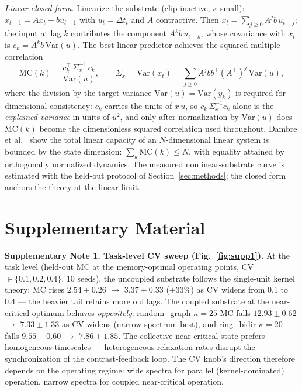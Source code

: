 \documentclass[11pt]{article}
\newcommand{\Dt}{\Delta t}
\newcommand{\MCI}{\mathrm{MC}}
\begin{document}
\textit{Linear closed form.} Linearize the substrate (clip inactive, $\kappa$
small): $x_{t+1}=A x_t+b u_{t+1}$ with $u_t=\Dt_t$ and $A$ contractive. Then
$x_t=\sum_{j\ge0}A^j b\,u_{t-j}$; the input at lag $k$ contributes the
component $A^{k}b\,u_{t-k}$, whose covariance with $x_t$ is
$c_k=A^{k}b\,\mathrm{Var}(u)$. The best linear predictor achieves the
squared multiple correlation
\begin{equation}
\MCI(k)=\frac{c_k^\top\,\Sigma_x^{-1}\,c_k}{\mathrm{Var}(u)},\qquad
\Sigma_x=\mathrm{Var}(x_t)=\sum_{j\ge0}A^j bb^\top(A^\top)^j\,\mathrm{Var}(u),
\label{eq:mc}
\end{equation}
where the division by the target variance $\mathrm{Var}(u)=\mathrm{Var}(y_k)$
is required for dimensional consistency: $c_k$ carries the units of
$x\,u$, so $c_k^\top\Sigma_x^{-1}c_k$ alone is the \emph{explained variance}
in units of $u^2$, and only after normalization by $\mathrm{Var}(u)$ does
$\MCI(k)$ become the dimensionless squared correlation used throughout.
Dambre et al.\ \cite{dambre2012} show the total linear capacity of an
$N$-dimensional linear system is bounded by the state dimension:
$\sum_k \MCI(k)\le N$, with equality attained by orthogonally normalized
dynamics. The measured nonlinear-substrate curve is estimated with the held-out
protocol of Section~\ref{sec:methods}; the closed form anchors the theory at
the linear limit.

\section*{Supplementary Material}
\label{sec:supp}

\setcounter{figure}{0}
\renewcommand{\thefigure}{S\arabic{figure}}

\textbf{Supplementary Note 1. Task-level CV sweep (Fig.~\ref{fig:supp1}).} At the task level
(held-out MC at the memory-optimal operating points, CV
$\in\{0.1,0.2,0.4\}$, 10 seeds), the uncoupled substrate follows the
single-unit kernel theory: MC rises $2.54\pm0.26$ $\to$ $3.37\pm0.33$
($+33\%$) as CV widens from
0.1 to 0.4 --- the heavier tail retains more old lags. The coupled substrate at
the near-critical optimum behaves \emph{oppositely}: random\_graph
$\kappa=25$ MC falls $12.93\pm0.62$ $\to$ $7.33\pm1.33$ as CV widens (narrow
spectrum best), and
ring\_bidir $\kappa=20$ falls $9.55\pm0.60$ $\to$ $7.86\pm1.85$. The collective near-critical
state prefers homogeneous timescales --- heterogeneous relaxation rates disrupt
the synchronization of the contrast-feedback loop. The CV knob's direction
therefore depends on the operating regime: wide spectra for parallel
(kernel-dominated) operation, narrow spectra for coupled near-critical
operation.
\end{document}
